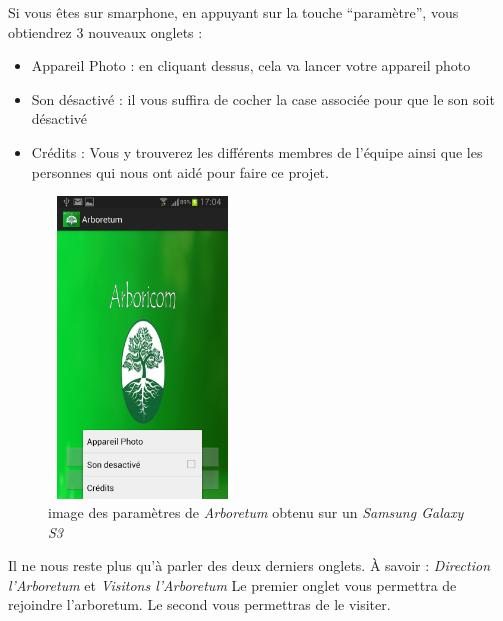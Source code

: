 \documentclass[a4paper,11pt]{article}
\begin{document}
     Si vous êtes sur smarphone, en appuyant sur la touche ``paramètre'', vous obtiendrez 3 nouveaux onglets : 
     \begin{itemize}
      \item Appareil Photo : en cliquant dessus, cela va lancer votre appareil photo 
      \item Son désactivé : il vous suffira de cocher la case associée pour que le son soit désactivé
      \item Crédits : Vous y trouverez les différents membres de l'équipe ainsi que les personnes qui nous ont aidé pour faire ce projet.
     \end{itemize}
         \begin{figure}[H]
     \begin{center}
    \includegraphics[width=5cm,height=8cm]{menuParamS3.png}
    \caption{image des paramètres de \textit{Arboretum} obtenu sur un \textit{Samsung Galaxy S3}}
     \end{center}
    \end{figure}

    
    Il ne nous reste plus qu'à parler des deux derniers onglets. À savoir : \textit{Direction l'Arboretum} et \textit{Visitons l'Arboretum}
    Le premier onglet vous permettra de rejoindre l'arboretum. Le second vous permettras de le visiter.
    
\end{document}
